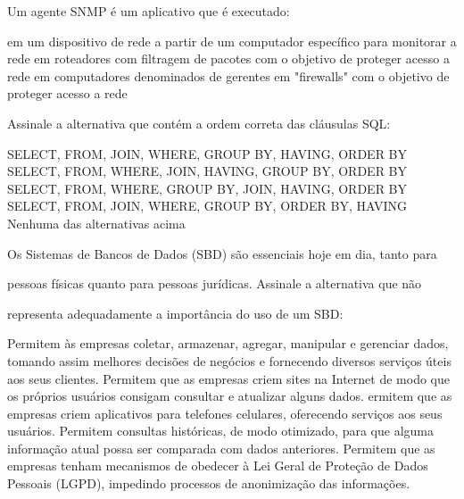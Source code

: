 \documentclass[12pt, addpoints]{exam}
\begin{document}
    \begin{questions}

    \newpage
    \question

Um agente SNMP é um aplicativo que é executado:
\begin{choices}
\choice em um dispositivo de rede
\choice a partir de um computador específico para monitorar a rede
\choice em roteadores com filtragem de pacotes com o objetivo de proteger acesso a rede
\choice em computadores denominados de gerentes
\choice em "firewalls" com o objetivo de proteger acesso a rede
\end{choices}

\question

Assinale a alternativa que contém a ordem correta das cláusulas SQL:


\begin{choices}
\choice SELECT, FROM, JOIN, WHERE, GROUP BY, HAVING, ORDER BY
\choice SELECT, FROM, WHERE, JOIN, HAVING, GROUP BY, ORDER BY
\choice SELECT, FROM, WHERE, GROUP BY, JOIN, HAVING, ORDER BY
\choice SELECT, FROM, JOIN, WHERE, GROUP BY, ORDER BY, HAVING
\choice Nenhuma das alternativas acima
\end{choices}

\question

Os Sistemas de Bancos de Dados (SBD) são essenciais hoje em dia, tanto para

pessoas físicas quanto para pessoas jurídicas. Assinale a alternativa que não

representa adequadamente a importância do uso de um SBD:
\begin{choices}
\choice Permitem às empresas coletar, armazenar, agregar, manipular e gerenciar dados, tomando assim melhores decisões de negócios e fornecendo diversos serviços úteis aos seus clientes.
\choice Permitem que as empresas criem sites na Internet de modo que os próprios usuários consigam consultar e atualizar alguns dados.
\choice ermitem que as empresas criem aplicativos para telefones celulares, oferecendo serviços aos seus usuários.
\choice Permitem consultas históricas, de modo otimizado, para que alguma informação atual possa ser comparada com dados anteriores.
\choice Permitem que as empresas tenham mecanismos de obedecer à Lei Geral de Proteção de Dados Pessoais (LGPD), impedindo processos de anonimização das informações.
\end{choices}


\end{questions}
\end{document}
